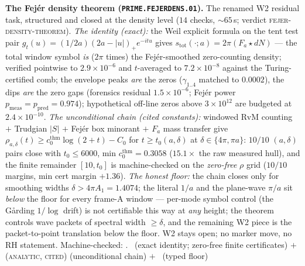 \documentclass[11pt,a4paper]{article}
\theoremstyle{definition}
\begin{document}
\par\smallskip\noindent\textbf{The Fej\'er density theorem
(\texttt{PRIME.FEJERDENS.01}).}
The renamed W2 residual task, structured and closed at the density
level ($14$ checks, ${\sim}65$\,s; verdict
\textsc{fejer-density-theorem}).  \emph{The identity (exact):} the
Weil explicit formula on the tent test pair
$g_t(u)=(1/2a)(2a-|u|)_+e^{-itu}$ gives
$s_{\mathrm{tot}}(\cdot;a)=2\pi(F_a\star dN)$ --- the total window
symbol \emph{is} ($2\pi$ times) the Fej\'er-smoothed zero-counting
density; verified pointwise to $2.9\times10^{-6}$ and $t$-averaged
to $7.2\times10^{-8}$ against the Turing-certified comb; the
envelope peaks \emph{are} the zeros ($\gamma_{1..4}$ matched to
$0.0002$), the dips \emph{are} the zero gaps (forensics residual
$1.5\times10^{-6}$; Fej\'er power
$p_{\mathrm{meas}}=p_{\mathrm{pred}}=0.974$); hypothetical off-line
zeros above $3\times10^{12}$ are budgeted at $2.4\times10^{-10}$.
\emph{The unconditional chain (cited constants):} windowed RvM
counting $+$ Trudgian $|S|$ $+$ Fej\'er box minorant $+$ $F_a$ mass
transfer give
$\rho_{a,\delta}(t)\ge c_0^{\mathrm{thm}}\log(2+t)-C_0$ for
$t\ge t_0(a,\delta)$ at $\delta\in\{4\pi,\pi a\}$: $10/10$
$(a,\delta)$ pairs close with $t_0\le6000$, min
$c_0^{\mathrm{thm}}=0.3058$ ($15.1\times$ the raw measured hull),
and the finite remainder $[10,t_0]$ is machine-checked on the
\emph{zero-free} $\rho$ grid ($10/10$ margins, min cert margin
$+1.36$).  \emph{The honest floor:} the chain closes only for
smoothing widths $\delta>4\pi A_1=1.4074$; the literal $1/a$ and the
plane-wave $\pi/a$ sit \emph{below} the floor for every frame-A
window --- per-mode symbol control (the G\aa rding $1/\log$ drift)
is not certifiable this way at \emph{any} height; the theorem
controls wave packets of spectral width $\ge\delta$, and the
remaining W2 piece is the packet-to-point translation below the
floor.  W2 stays open; no marker move, no RH statement.
Machine-checked: .
\mE\ (exact identity; zero-free finite certificates) $+$
(\textsc{analytic, cited}) (unconditional chain) $+$ \mC\ (typed
floor)
\par\smallskip
\end{document}
